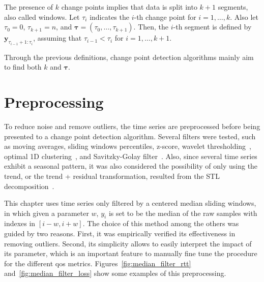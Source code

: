 The presence of $k$ change points implies that data is split into $k+1$
segments, also called windows. Let $\tau_{i}$ indicates the $i$-th change point
for $i=1, \ldots, k$. Also let $\tau_{0} = 0$, $\tau_{k + 1} = n$, and
$\boldsymbol \tau = (\tau_{0}, \ldots, \tau_{k + 1})$. Then, the $i$-th segment
is defined by $\mathbf{y}_{\tau_{i - 1} + 1 : \tau_{i}}$, assuming that
$\tau_{i - 1} < \tau_{i}$ for $i = 1, \ldots, k + 1$.

Through the previous definitions, change point detection algorithms mainly aim
to find both $k$ and $\boldsymbol \tau$.

\section{Preprocessing}

To reduce noise and remove outliers, the time series are
preprocessed before being presented to a change point detection algorithm.
Several filters were tested, such as moving averages, sliding windows
percentiles, z-score,
wavelet thresholding~\cite{an_introduction_to_wavelets}, optimal 1D
clustering~\cite{ckmeans_1d_dp_optimal_k_means_clustering_in_one_dimension_by_dynamic_programming},
and Savitzky-Golay filter~\cite{savgol}.
Also, since several time series exhibit a seasonal pattern,
it was also considered the possibility of only using the
trend, or the trend + residual transformation,
resulted from the STL
decomposition~\cite{stl_a_seasonal_trend_decomposition_procedure_based_on_loess}.

This chapter uses time series only filtered by a centered median
sliding windows, in which given a parameter $w$, $y_{i}$ is set to be
the median of the raw samples with indexes in $[i-w, i+w]$.
The choice of this method among the others was guided by two reasons.
First, it was empirically verified its effectiveness in removing outliers.
Second, its simplicity allows to easily interpret the impact of its parameter,
which is an important feature to manually fine tune the procedure for the
different \gls*{qos} metrics.
Figures~\ref{fig:median_filter_rtt} and~\ref{fig:median_filter_loss} show
some examples of this preprocessing.

